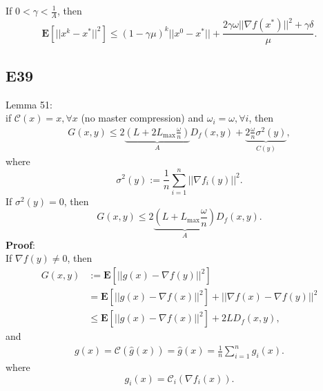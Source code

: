 \documentclass[12pt]{article}
\begin{document}
If $0 < \gamma < \frac{1}{A}$, then
\begin{equation*}
    \mathbf{E}\left[ ||x^k - x^*||^2 \right] \leq (1-\gamma \mu)^k ||x^0 - x^* || + \frac{2\gamma\omega|| \nabla f(x^*)||^2 + \gamma\delta}{\mu}.
\end{equation*}

\subsection*{E39}
Lemma 51: \\
if $\mathcal{C}(x) = x, \forall x$ (no master compression) and $\omega_i = \omega,\forall i$, then
\begin{equation*}
    \begin{split}
        G(x,y) \leq 2 \underbrace{\left(L + 2L_{\text{max}}\frac{\omega}{n}\right)}_{A}D_f(x,y) + \underbrace{2\frac{\omega}{n}\sigma^2(y)}_{C(y)},
    \end{split}
\end{equation*}
where
\begin{equation*}
    \sigma^2(y) := \frac{1}{n}\sum_{i=1}^n ||\nabla f_i(y)||^2.
\end{equation*}
If $\sigma^2(y) = 0$, then
\begin{equation*}
    G(x,y) \leq 2 \underbrace{\left(L + L_{\text{max}}\frac{\omega}{n}\right)}_{A}D_f(x,y).
\end{equation*}
\textbf{Proof}: \\
If $\nabla f(y) \neq 0$, then
\begin{equation}
    \begin{split}
        G(x,y) &:= \mathbf{E}\left[ ||g(x) - \nabla f(y)||^2 \right] \\
                &= \mathbf{E}\left[ ||g(x) - \nabla f(x)||^2 \right] + ||\nabla f(x) - \nabla f(y)||^2 \\
                &\leq \mathbf{E}\left[ ||g(x) - \nabla f(x)||^2 \right] + 2LD_f(x,y),
    \end{split}
\end{equation}
and
\begin{equation}
    \begin{split}
        g(x)   = \mathcal{C}(\hat{g}(x)) = \hat{g}(x) = \frac{1}{n}\sum_{i=1}^n g_i(x).
    \end{split}
    \label{eq:p9g}
\end{equation}
where
\begin{equation*}
    g_i(x) = \mathcal{C}_i(\nabla f_i (x)).
\end{equation*}
\end{document}
